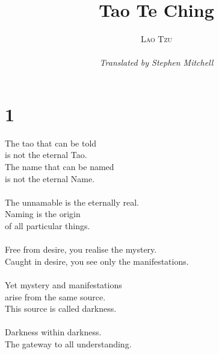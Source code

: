 \documentclass[b5paper, 12pt, oneside]{book}
\begin{document}
\title{\Huge Tao Te Ching}
\author{\textsc{Lao Tzu} \\ \\ \normalsize \textit{Translated by Stephen Mitchell}}

\date{} %

\maketitle
\clearpage
\phantom{s}
\thispagestyle{empty}

\mainmatter

\pagestyle{fancyplain} %
\fancyhf{} %

\chapter*{1}
The tao that can be told\\
is not the eternal Tao. \\
The name that can be named\\
is not the eternal Name. \\
\\
The unnamable is the eternally real.\\
Naming is the origin\\
of all particular things.\\
\\
Free from desire, you realise the mystery.\\
Caught in desire, you see only the manifestations.\\
\\
Yet mystery and manifestations\\
arise from the same source.\\
This source is called darkness.\\
\\
Darkness within darkness.\\
The gateway to all understanding.\\
\end{document}
